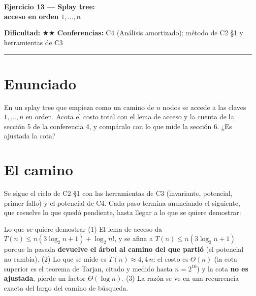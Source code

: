 \documentclass[11pt]{article}
\begin{document}
{\LARGE\bfseries\color{azultitulo} Ejercicio 13 --- Splay tree:\\ acceso en orden \texorpdfstring{$1,\dots,n$}{1,...,n}}

\vspace{2pt}
\textbf{Dificultad:} $\bigstar\bigstar$ \quad \textbf{Conferencias:} C4 (Análisis amortizado);
método de C2 §1 y herramientas de C3
\vspace{8pt}
\hrule
\vspace{12pt}

\section*{Enunciado}
\begin{enunciado}
En un splay tree que empieza como un camino de $n$ nodos se accede a las claves $1,\dots,n$ en orden.
Acota el costo total con el lema de acceso y la cuenta de la sección 5 de la conferencia 4, y compáralo con
lo que mide la sección 6. ¿Es ajustada la cota?
\end{enunciado}

\section*{El camino}

Se sigue el ciclo de C2 §1 con las herramientas de C3 (invariante, potencial, primer fallo) y el potencial de C4.
Cada paso termina anunciando el siguiente, que resuelve lo que quedó pendiente, hasta llegar a lo que se quiere demostrar:

\begin{resultado}{Lo que se quiere demostrar}
(1) El lema de acceso da $T(n)\le n(3\log_2 n+1)+\log_2 n!$, y se afina a $T(n)\le n(3\log_2n+1)$ porque la
pasada \textbf{devuelve el árbol al camino del que partió} (el potencial no cambia). (2) Lo que se mide es
$T(n)\approx4{,}4\,n$: el costo es $\Theta(n)$ (la cota superior es el teorema de Tarjan, citado y medido hasta $n=2^{16}$) y la cota \textbf{no es ajustada}, pierde un factor $\Theta(\log n)$.
(3) La razón se ve en una recurrencia exacta del largo del camino de búsqueda.
\end{resultado}
\end{document}
